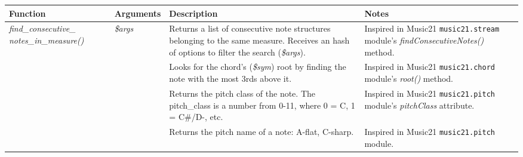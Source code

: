 \begin{center}
  \begin{tabular}{|p{3.25cm}|p{2cm}|p{5.25cm}|p{4.5cm}|}
    \hline
    Function & Arguments & Description & Notes \\
    \hline
    \hline
    \multirow{5}{3cm}{\emph{find\_consecutive\_
    notes\_in\_measure()}}
    & \multirow{5}{*}{\emph{\$args}}
    & Returns a list of consecutive note structures belonging to the same measure. Receives an hash
    of options to filter the search (\emph{\$args}).
    & Inspired in Music21 \texttt{music21.stream} module's \emph{findConsecutiveNotes()} method.
    \\
    \hline

    \hline
    \multirow{3}{*}{\emph{root()}}
    & \multirow{3}{*}{\emph{\$sym}}
    & Looks for the chord's (\emph{\$sym}) root by finding the note with the most 3rds above it.
    & Inspired in Music21 \texttt{music21.chord} module's \emph{root()} method.
    \\
    \hline

    \hline
    \multirow{4}{*}{\emph{get\_pitch\_class()}}
    & \multirow{4}{*}{\emph{\$note}}
    & Returns the pitch class of the note. The pitch\_class is a number from 0-11, where 0 = C, 1 =
    C\#/D-, etc.
    & Inspired in Music21 \texttt{music21.pitch} module's \emph{pitchClass} attribute.
    \\
    \hline

    \hline
    \multirow{2}{*}{\emph{get\_pitch\_name()}}
    & \multirow{2}{*}{\emph{\$note}}
    & Returns the pitch name of a note: A-flat, C-sharp.
    & Inspired in Music21 \texttt{music21.pitch} module.
    \\
    \hline
  \end{tabular}
\end{center}
